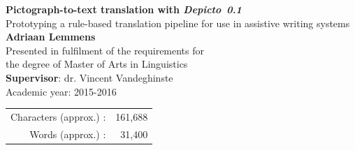 \documentclass[12pt, a4paper]{report} %
\newcommand{\depicto}{\emph{Depicto}}
\begin{document}
\begin{titlepage}
        \vspace*{2.8cm}
        \raggedright\Huge
        \textbf{Pictograph-to-text translation with \depicto\ \emph{0.1}}\\
        \vspace*{1cm}
        \LARGE
        Prototyping a rule-based translation
        pipeline for use in assistive writing systems\\ %
        \vspace*{2.8cm}
        \raggedleft\Large
        \textbf{Adriaan Lemmens} \\
        \vspace*{0.5cm}
        \normalsize \raggedleft
        Presented in fulfilment of the requirements for\\the
        degree of Master of Arts in Linguistics \\
        \vspace*{0.5cm}
        \textbf{Supervisor}: dr. Vincent Vandeghinste\\
        \vspace*{0.5cm}
        Academic year: 2015-2016\\
        \vspace*{0.5cm}
        \scriptsize\color{black}
        \begin{tabular}{r r}
            Characters (approx.) : & 161,688 \\
            Words (approx.) : & 31,400
        \end{tabular}
\end{titlepage}


\end{document}
